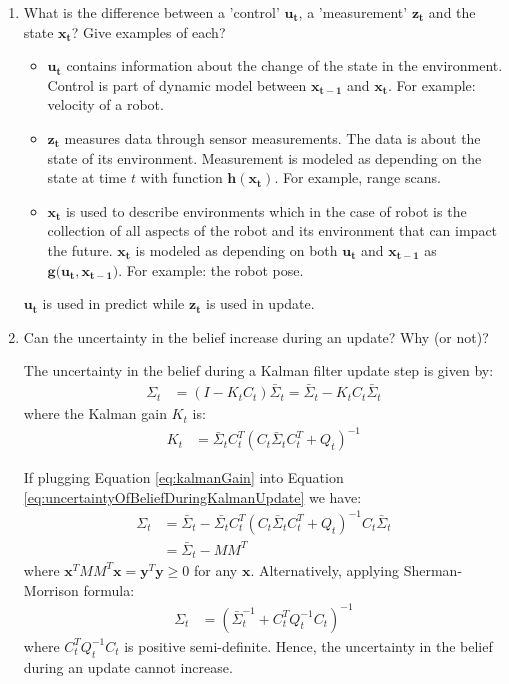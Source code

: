 \documentclass[11pt,a4paper]{article}
\begin{document}
\begin{enumerate}
	\item \addtocounter{cnt_questions}{1} What is the difference between a 'control' $\mathbf{u_{t}}$, a 'measurement' $\mathbf{z_{t}}$ and the state $\mathbf{x_{t}}$?  Give examples of each?
		\begin{itemize}
			\item $\mathbf{u_{t}}$ contains information about the change of the state in the environment. Control is part of dynamic model between $\mathbf{x_{t-1}}$ and $\mathbf{x_{t}}$. For example: velocity of a robot.
			\item $\mathbf{z_{t}}$ measures data through sensor measurements. The data is about the state of its environment. Measurement is modeled as depending on the state at time $t$ with function $\mathbf{h(x_{t})}$. For example, range scans.
			\item $\mathbf{x_{t}}$ is used to describe environments which in the case of robot is the collection of all aspects of the robot and its environment that can impact the future. $\mathbf{x_{t}}$ is modeled as depending on both $\mathbf{u_{t}}$ and $\mathbf{x_{t-1}}$ as $\mathbf{g}(\mathbf{u_{t}}, \mathbf{x_{t-1})}$. For example: the robot pose.
		\end{itemize}
		\par $\mathbf{u_{t}}$ is used in predict while $\mathbf{z_{t}}$ is used in update.
	\item \addtocounter{cnt_questions}{1} Can the uncertainty in the belief increase during an update? Why (or not)?
		\par The uncertainty in the belief during a Kalman filter update step is given by:
		\begin{align}
			\Sigma_t &= (I - K_{t} C_{t}) \bar{\Sigma}_{t} = \bar{\Sigma}_{t} - K_{t} C_{t} \bar{\Sigma}_{t} \label{eq:uncertaintyOfBeliefDuringKalmanUpdate}
		\end{align}
		where the Kalman gain $K_{t}$ is:
		\begin{align}
			K_{t} &= \bar{\Sigma}_{t}C_{t}^{T}(C_{t} \bar{\Sigma}_{t}C_{t}^{T} + Q_{t})^{-1} \label{eq:kalmanGain}
		\end{align}
		\par If plugging Equation \ref{eq:kalmanGain} into Equation \ref{eq:uncertaintyOfBeliefDuringKalmanUpdate} we have:
		\begin{align}
			\Sigma_{t} &= \bar{\Sigma}_{t} - \bar{\Sigma_t} C_{t}^{T} (C_{t} \bar{\Sigma}_{t} C_{t}^{T} + Q_{t})^{-1} C_{t} \bar{\Sigma}_{t} \\
			&= \bar{\Sigma}_{t} - MM^{T}			
		\end{align}
		where $\mathbf{x}^{T}MM^{T}\mathbf{x}=\mathbf{y}^{T}\mathbf{y} \geq 0$ for any $\mathbf{x}$. Alternatively, applying Sherman-Morrison formula:
		\begin{align}
			\Sigma_{t} &= (\bar{\Sigma}_{t}^{-1} + C_{t}^{T}Q_{t}^{-1}C_{t})^{-1}
		\end{align}
		where $C_t^T Q_t^{-1}C_t$ is positive semi-definite. Hence, the uncertainty in the belief during an update cannot increase.


\end{enumerate}
\end{document}
